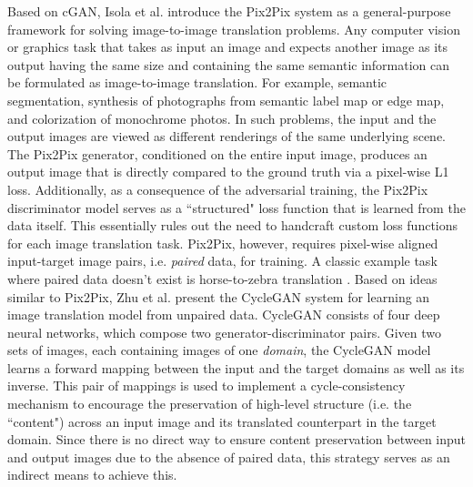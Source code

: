Based on cGAN, Isola et al. \cite{isola2017image} introduce the Pix2Pix system as a general-purpose framework for solving image-to-image translation problems. Any computer vision or graphics task that takes as input an image and expects another image as its output having the same size and containing the same semantic information can be formulated as image-to-image translation. For example, semantic segmentation, synthesis of photographs from semantic label map or edge map, and colorization of monochrome photos. In such problems, the input and the output images are viewed as different renderings of the same underlying scene. The Pix2Pix generator, conditioned on the entire input image, produces an output image that is directly compared to the ground truth via a pixel-wise L1 loss. Additionally, as a consequence of the adversarial training, the Pix2Pix discriminator model serves as a ``structured" loss function that is learned from the data itself. This essentially rules out the need to handcraft custom loss functions for each image translation task. Pix2Pix, however, requires pixel-wise aligned input-target image pairs, i.e. \textit{paired} data, for training. A classic example task where paired data doesn't exist is horse-to-zebra translation \cite{zhu2017unpaired}. Based on ideas similar to Pix2Pix, Zhu et al. present the CycleGAN system \cite{zhu2017unpaired} for learning an image translation model from unpaired data. CycleGAN consists of four deep neural networks, which compose two generator-discriminator pairs. Given two sets of images, each containing images of one \textit{domain}, the CycleGAN model learns a forward mapping between the input and the target domains as well as its inverse. This pair of mappings is used to implement a cycle-consistency mechanism to encourage the preservation of high-level structure (i.e. the ``content") across an input image and its translated counterpart in the target domain. Since there is no direct way to ensure content preservation between input and output images due to the absence of paired data, this strategy serves as an indirect means to achieve this.

